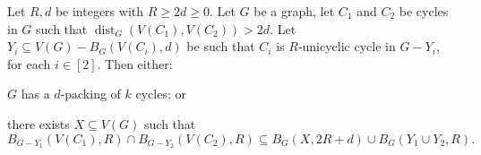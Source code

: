\documentclass{patmorin}
\DeclareMathOperator{\dist}{dist}
\begin{document}
\begin{lem}\label{double_unicycle}
  Let $R,d$ be integers with $R\geq 2d\geq 0$. 
  Let $G$ be a graph, 
  let $C_1$ and $C_2$ be cycles in $G$ such that
  $\dist_G(V(C_1),V(C_2))>2d$. 
  Let $Y_i\subseteq V(G) - B_G(V(C_i),d)$ be such that $C_i$ is $R$-unicyclic cycle in $G-Y_i$, 
  for each $i\in[2]$. 
  Then either:
  \begin{compactenum}[(a)]
    \item $G$ has a $d$-packing of $k$ cycles; or
    \item there exists $X\subseteq V(G)$ such that \[
    B_{G-Y_1}(V(C_1),R)\cap B_{G-Y_2}(V(C_2),R) \subseteq B_G(X,2R+d) \cup B_G(Y_1\cup Y_2,R).
    \]
  \end{compactenum}
\end{lem}
\end{document}
